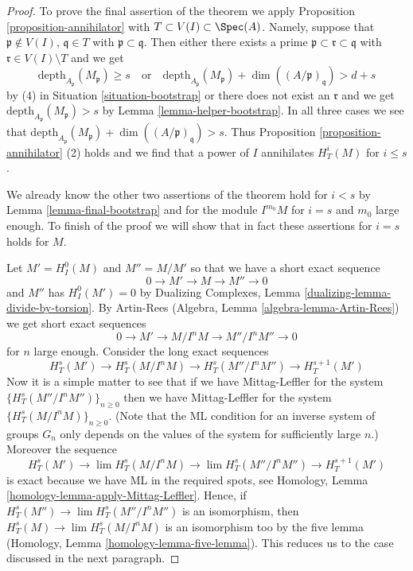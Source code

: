 \begin{proof}
To prove the final assertion of the theorem we apply
Proposition \ref{proposition-annihilator} with
$T \subset V(I) \subset \Spec(A)$. Namely, suppose
that $\mathfrak p \not \in V(I)$, $\mathfrak q \in T$
with $\mathfrak p \subset \mathfrak q$.
Then either there exists a prime
$\mathfrak p \subset \mathfrak r \subset \mathfrak q$
with $\mathfrak r \in V(I) \setminus T$ and we get
$$
\text{depth}_{A_\mathfrak p}(M_\mathfrak p) \geq s
\quad\text{or}\quad
\text{depth}_{A_\mathfrak p}(M_\mathfrak p) +
\dim((A/\mathfrak p)_\mathfrak q) > d + s
$$
by (4) in Situation \ref{situation-bootstrap} or there does
not exist an $\mathfrak r$ and we get
$\text{depth}_{A_\mathfrak p}(M_\mathfrak p) > s$ by
Lemma \ref{lemma-helper-bootstrap}.
In all three cases we see that
$\text{depth}_{A_\mathfrak p}(M_\mathfrak p) +
\dim((A/\mathfrak p)_\mathfrak q) > s$.
Thus Proposition \ref{proposition-annihilator} (2)
holds and we find that a power of $I$ annihilates
$H^i_T(M)$ for $i \leq s$.

\medskip\noindent
We already know the other two assertions of the theorem hold
for $i < s$ by Lemma \ref{lemma-final-bootstrap} and for the
module $I^{m_0}M$ for $i = s$ and $m_0$ large enough.
To finish of the proof we will show that in fact these
assertions for $i = s$ holds for $M$.

\medskip\noindent
Let $M' = H^0_I(M)$ and $M'' = M/M'$ so that we have a short exact
sequence
$$
0 \to M' \to M \to M'' \to 0
$$
and $M''$ has $H^0_I(M') = 0$ by
Dualizing Complexes, Lemma \ref{dualizing-lemma-divide-by-torsion}.
By Artin-Rees (Algebra, Lemma \ref{algebra-lemma-Artin-Rees})
we get short exact sequences
$$
0 \to M' \to M/I^n M \to M''/I^n M'' \to 0
$$
for $n$ large enough. Consider the long exact sequences
$$
H^s_T(M') \to
H^s_T(M/I^nM) \to
H^s_T(M''/I^nM'') \to
H^{s + 1}_T(M')
$$
Now it is a simple matter to see that if we have Mittag-Leffler
for the system $\{H^s_T(M''/I^nM'')\}_{n \geq 0}$
then we have Mittag-Leffler for the system
$\{H^s_T(M/I^nM)\}_{n \geq 0}$.
(Note that the ML condition for an inverse system of groups $G_n$
only depends on the values of the system for sufficiently large $n$.)
Moreover the sequence
$$
H^s_T(M') \to
\lim H^s_T(M/I^nM) \to
\lim H^s_T(M''/I^nM'') \to
H^{s + 1}_T(M')
$$
is exact because we have ML in the required spots, see
Homology, Lemma \ref{homology-lemma-apply-Mittag-Leffler}.
Hence, if $H^s_T(M'') \to \lim H^s_T(M''/I^nM'')$
is an isomorphism, then
$H^s_T(M) \to \lim H^s_T(M/I^nM)$
is an isomorphism too by the five lemma
(Homology, Lemma \ref{homology-lemma-five-lemma}).
This reduces us to the case discussed in the next paragraph.


\end{proof}
